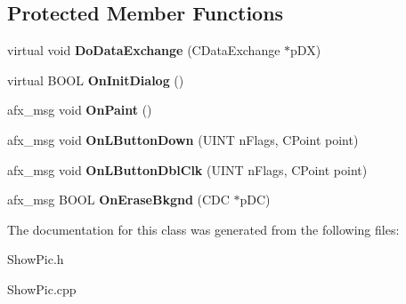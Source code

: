 \subsection*{Protected Member Functions}
\begin{DoxyCompactItemize}
\item 
\hypertarget{class_c_show_pic_a7fbda3000dbe7ef51247748e2b21dfcd}{virtual void {\bfseries Do\-Data\-Exchange} (C\-Data\-Exchange $\ast$p\-D\-X)}\label{class_c_show_pic_a7fbda3000dbe7ef51247748e2b21dfcd}

\item 
\hypertarget{class_c_show_pic_aaed14e0401823269288fd18a3e7756d8}{virtual B\-O\-O\-L {\bfseries On\-Init\-Dialog} ()}\label{class_c_show_pic_aaed14e0401823269288fd18a3e7756d8}

\item 
\hypertarget{class_c_show_pic_acf2bb3a5b3740cfbcf17c5d86ea05353}{afx\-\_\-msg void {\bfseries On\-Paint} ()}\label{class_c_show_pic_acf2bb3a5b3740cfbcf17c5d86ea05353}

\item 
\hypertarget{class_c_show_pic_ae34e2fda431c631a0c195df6cb99c85a}{afx\-\_\-msg void {\bfseries On\-L\-Button\-Down} (U\-I\-N\-T n\-Flags, C\-Point point)}\label{class_c_show_pic_ae34e2fda431c631a0c195df6cb99c85a}

\item 
\hypertarget{class_c_show_pic_af9beeddc0502c26eed2aa4e4eb17ac34}{afx\-\_\-msg void {\bfseries On\-L\-Button\-Dbl\-Clk} (U\-I\-N\-T n\-Flags, C\-Point point)}\label{class_c_show_pic_af9beeddc0502c26eed2aa4e4eb17ac34}

\item 
\hypertarget{class_c_show_pic_a477731aca07d236cd5fd74bf3961f10e}{afx\-\_\-msg B\-O\-O\-L {\bfseries On\-Erase\-Bkgnd} (C\-D\-C $\ast$p\-D\-C)}\label{class_c_show_pic_a477731aca07d236cd5fd74bf3961f10e}

\end{DoxyCompactItemize}


The documentation for this class was generated from the following files\-:\begin{DoxyCompactItemize}
\item 
Show\-Pic.\-h\item 
Show\-Pic.\-cpp\end{DoxyCompactItemize}
